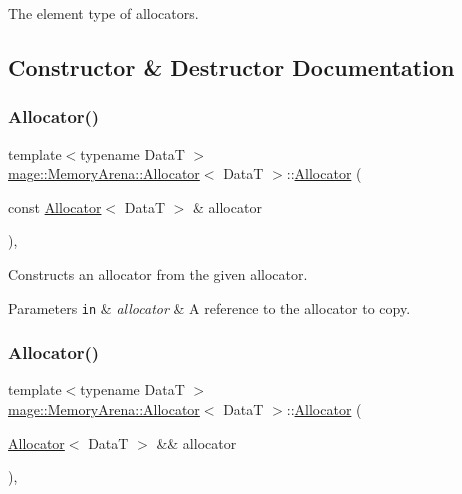 The element type of allocators. 

\subsection{Constructor \& Destructor Documentation}
\hypertarget{classmage_1_1_memory_arena_1_1_allocator_ac7d640d69207604612c29ebc60ec6648}{}\label{classmage_1_1_memory_arena_1_1_allocator_ac7d640d69207604612c29ebc60ec6648} 
\subsubsection{\texorpdfstring{Allocator()}{Allocator()}\hspace{0.1cm}{\footnotesize\ttfamily [1/4]}}
{\footnotesize\ttfamily template$<$typename DataT $>$ \\
\hyperlink{classmage_1_1_memory_arena_1_1_allocator}{mage\+::\+Memory\+Arena\+::\+Allocator}$<$ DataT $>$\+::\hyperlink{classmage_1_1_memory_arena_1_1_allocator}{Allocator} (\begin{DoxyParamCaption}\item[{const \hyperlink{classmage_1_1_memory_arena_1_1_allocator}{Allocator}$<$ DataT $>$ \&}]{allocator }\end{DoxyParamCaption})\hspace{0.3cm}{\ttfamily [default]}, {\ttfamily [noexcept]}}

Constructs an allocator from the given allocator.


\begin{DoxyParams}[1]{Parameters}
\mbox{\tt in}  & {\em allocator} & A reference to the allocator to copy. \\
\hline
\end{DoxyParams}
\hypertarget{classmage_1_1_memory_arena_1_1_allocator_a54ddc035b0987d71776c54a1240be18d}{}\label{classmage_1_1_memory_arena_1_1_allocator_a54ddc035b0987d71776c54a1240be18d} 
\subsubsection{\texorpdfstring{Allocator()}{Allocator()}\hspace{0.1cm}{\footnotesize\ttfamily [2/4]}}
{\footnotesize\ttfamily template$<$typename DataT $>$ \\
\hyperlink{classmage_1_1_memory_arena_1_1_allocator}{mage\+::\+Memory\+Arena\+::\+Allocator}$<$ DataT $>$\+::\hyperlink{classmage_1_1_memory_arena_1_1_allocator}{Allocator} (\begin{DoxyParamCaption}\item[{\hyperlink{classmage_1_1_memory_arena_1_1_allocator}{Allocator}$<$ DataT $>$ \&\&}]{allocator }\end{DoxyParamCaption})\hspace{0.3cm}{\ttfamily [default]}, {\ttfamily [noexcept]}}


